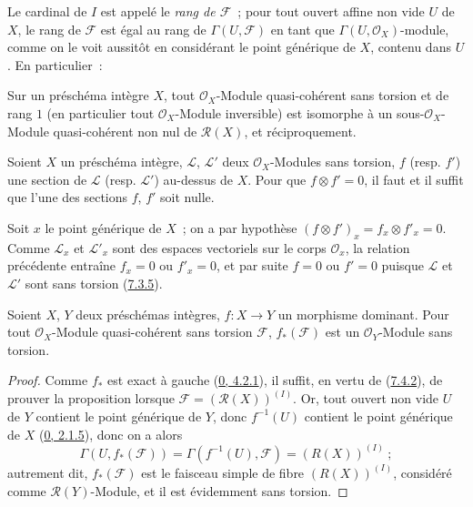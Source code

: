 Le cardinal de $I$ est appelé le \emph{rang de $\mathscr{F}$}~; pour tout
ouvert affine non vide $U$ de $X$, le rang de $\mathscr{F}$ est égal au rang
de $\Gamma(U,\mathscr{F})$ en tant que $\Gamma(U,\mathscr{O}_X)$-module,
comme on le voit aussitôt en considérant le point générique de $X$, contenu
dans $U$. En particulier~:

\begin{corollary}[7.4.3]
\label{I.7.4.3-fr}
Sur un préschéma intègre $X$, tout $\mathscr{O}_X$-Module quasi-cohérent sans
torsion et de rang $1$ (en particulier tout $\mathscr{O}_X$-Module
inversible) est isomorphe à un sous-$\mathscr{O}_X$-Module quasi-cohérent non nul de
$\mathscr{R}(X)$, et réciproquement.
\end{corollary}

\begin{corollary}[7.4.4]
\label{I.7.4.4-fr}
Soient $X$ un préschéma intègre, $\mathscr{L}$, $\mathscr{L}'$ deux
$\mathscr{O}_X$-Modules sans torsion, $f$ (resp. $f'$) une section de
$\mathscr{L}$ (resp. $\mathscr{L}'$) au-dessus de $X$. Pour que
$f\otimes f'=0$, il faut et il suffit que l'une des sections $f$, $f'$ soit
nulle.
\end{corollary}

Soit $x$ le point générique de $X$~; on a par hypothèse
$(f\otimes f')_x=f_x\otimes f'_x=0$. Comme $\mathscr{L}_x$ et
$\mathscr{L}'_x$ sont des espaces vectoriels sur le corps
$\mathscr{O}_x$, la relation précédente entraîne $f_x=0$ ou $f'_x=0$, et par
suite $f=0$ ou $f'=0$ puisque $\mathscr{L}$ et $\mathscr{L}'$ sont sans
torsion (\hyperref[I.7.3.5-fr]{7.3.5}).

\begin{proposition}[7.4.5]
\label{I.7.4.5-fr}
Soient $X$, $Y$ deux préschémas intègres, $f:X\to Y$ un morphisme dominant.
Pour tout $\mathscr{O}_X$-Module quasi-cohérent sans torsion $\mathscr{F}$,
$f_*(\mathscr{F})$ est un $\mathscr{O}_Y$-Module sans torsion.
\end{proposition}

\begin{proof}
Comme $f_*$ est exact à gauche
(\hyperref[0.4.2.1-fr]{0, 4.2.1}), il suffit, en vertu de
(\hyperref[I.7.4.2-fr]{7.4.2}), de prouver la proposition lorsque
$\mathscr{F}=(\mathscr{R}(X))^{(I)}$. Or, tout ouvert non vide $U$ de $Y$
contient le point générique de $Y$, donc $f^{-1}(U)$ contient le point
générique de $X$ (\hyperref[0.2.1.5-fr]{0, 2.1.5}), donc on a alors
\[
  \Gamma(U,f_*(\mathscr{F}))
  =\Gamma(f^{-1}(U),\mathscr{F})=(R(X))^{(I)}~;
\]
autrement dit, $f_*(\mathscr{F})$ est le faisceau simple de fibre
$(R(X))^{(I)}$, considéré comme $\mathscr{R}(Y)$-Module, et il est évidemment
sans torsion.
\end{proof}

